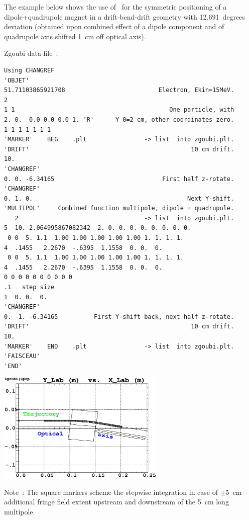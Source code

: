 \bigskip

\noindent The example below shows the use of  \CHANGREF\ for the symmetric positioning of 
a dipole+quadrupole  magnet in a drift-bend-drift geometry with 
12.691~degrees deviation (obtained upon combined effect of  a dipole component and 
of quadrupole axis shifted 1~cm off optical axis). 

\medskip

\begin{center}
\begin{minipage}{.38\linewidth}

 Zgoubi data file~: 

\tiny
\begin{verbatim}
Using CHANGREF
'OBJET'
51.71103865921708                          Electron, Ekin=15MeV.
2
1 1                                           One particle, with
2. 0.  0.0 0.0 0.0 1. 'R'      Y_0=2 cm, other coordinates zero.
1 1 1 1 1 1 1 
'MARKER'    BEG    .plt                -> list  into zgoubi.plt.
'DRIFT'                                             10 cm drift.
10.
'CHANGREF'  
0. 0. -6.34165                              First half z-rotate.
'CHANGREF'  
0. 1. 0.                                           Next Y-shift.
'MULTIPOL'     Combined function multipole, dipole + quadrupole.
   2                                   -> list  into zgoubi.plt.
5  10. 2.064995867082342  2. 0. 0. 0. 0. 0. 0. 0. 0.
 0 0  5. 1.1  1.00 1.00 1.00 1.00 1.00 1. 1. 1. 1.                              
4  .1455   2.2670  -.6395  1.1558  0. 0.  0.                                    
 0 0  5. 1.1  1.00 1.00 1.00 1.00 1.00 1. 1. 1. 1.                              
4  .1455   2.2670  -.6395  1.1558  0. 0.  0.                                    
0 0 0 0 0 0 0 0 0 0
.1   step size
1  0. 0.  0.
'CHANGREF'
0. -1. -6.34165          First Y-shift back, next half z-rotate.
'DRIFT'                                             10 cm drift.
10.
'MARKER'    END    .plt                -> list  into zgoubi.plt.
'FAISCEAU'
'END'
\end{verbatim}
\normalsize
\end{minipage}\hspace{.05\linewidth}
\begin{minipage}{.5\linewidth}
\centerline{\includegraphics*[bbllx=20,bblly=100,bburx=567,bbury=470,width=8cm]{FigCHAREFb.eps}}

Note~: The square markers scheme the stepwise integration in case of $\pm$5~cm additional fringe field 
extent upstream and downstream of the 5~cm long multipole. 
\end{minipage}
\end{center}


